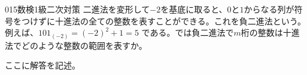 \begin{thm}{015}{}{数検1級二次対策}
 二進法を変形して$-2$を基底に取ると、$0$と$1$からなる列が符号をつけずに十進法の全ての整数を表すことができる。これを負二進法という。例えば、$101_{(-2)}=(-2)^2+1=5$ である。では負二進法で$m$桁の整数は十進法でどのような整数の範囲を表すか。
\end{thm}

ここに解答を記述。
